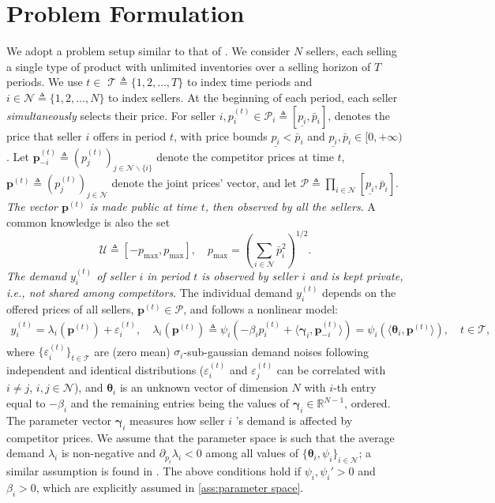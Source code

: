 \documentclass{article} %
\begin{document}
\section{Problem Formulation}
We adopt a problem setup similar to that of \cite{li2024lego}. We consider $N$ sellers, each selling a single type of product with unlimited inventories over a selling horizon of $T$ periods. We use $t \in$ $\mathcal{T}\triangleq \{1,2, \ldots, T\}$ to index time periods and $i \in \mathcal{N}\triangleq \{1,2, \ldots, N\}$ to index sellers. At the beginning of each period, each seller \emph{simultaneously} selects their price. For seller $i, p_i^{(t)} \in \mathcal{P}_i\triangleq [\underline{p_i}, \bar{p}_i]$, denotes the price that seller $i$ offers in period $t$, with price bounds $\underline{p_i}< \bar{p}_i$ and $\underline{p_i}, \bar{p}_i \in[0,+\infty)$. Let $\mathbf{p}_{-i}^{(t)}\triangleq  (p_j^{(t)})_{j \in \mathcal{N} \backslash\{i\}}$ denote the competitor prices at time $t$, $\mathbf{p}^{(t)}\triangleq (p_j^{(t)})_{j \in \mathcal{N}}$ denote the joint prices' vector, and let $\mathcal{P}\triangleq \prod_{i \in \mathcal{N}}[\underline{p_i}, \bar{p}_i]$. \emph{The vector $\mathbf{p}^{(t)}$ is made public at time $t$, then observed by all the sellers}. A common knowledge is also the set 
\begin{equation}\label{eq:upsilon}
\textstyle \mathcal{U} \triangleq [-p_{\max},p_{\max}],\quad p_{\max} =\left(\sum_{i\in\mathcal{N}}\bar{p}_i^2\right)^{1/2}.
\end{equation}
\emph{The demand $y_i^{(t)}$ of seller $i$ in period $t$ is observed by seller $i$ and is kept private, i.e., not shared among competitors}. The individual demand $y_i^{(t)}$ depends on the offered prices of all sellers, $\mathbf{p}^{(t)}\in \mathcal{P}$, and follows a nonlinear model:
\begin{align}\label{model_demand}
\textstyle  y_i^{(t)}= \lambda_i(\mathbf{p}^{(t)}) +\varepsilon_i^{(t)},\quad \lambda_i(\mathbf{p}^{(t)})\triangleq \psi_i( -\beta_i p_i^{(t)}+\langle\boldsymbol{\gamma}_i, \mathbf{p}_{-i}^{(t)}\rangle) = \psi_i(\langle\boldsymbol{\theta}_i,\mathbf{p}^{(t)}\rangle),\quad t \in \mathcal{T},
\end{align}
\noindent
where $\{\varepsilon_i^{(t)}\}_{t \in \mathcal{T}}$ are (zero mean) $\sigma_i$-sub-gaussian demand noises following independent and identical distributions ($\varepsilon_i^{(t)}$ and $\varepsilon_j^{(t)}$ can be correlated with $i \neq j$, $i,j \in \mathcal{N}$), and $\boldsymbol{\theta}_i$ is an unknown vector of dimension $N$ with $i$-th entry equal to $-\beta_i$ and the remaining entries being the values of $\boldsymbol{\gamma}_{i}\in \mathbb{R}^{N-1}$,  ordered. The parameter vector $\boldsymbol{\gamma}_i$ measures how seller $i$ 's demand is affected by competitor prices. We assume that the parameter space is such that the average demand $\lambda_i$ is non-negative and $\partial_{p_i}\lambda_i <0$ among all values of $\{\boldsymbol{\theta}_i,\psi_i\}_{i \in \mathcal{N}}$; a similar assumption is found in \cite{birge2024interfere, li2024lego}. The above conditions hold if $\psi_i,\psi_i'>0$ and $\beta_i>0$, which are explicitly assumed in \cref{ass:parameter space}. 
\end{document}
